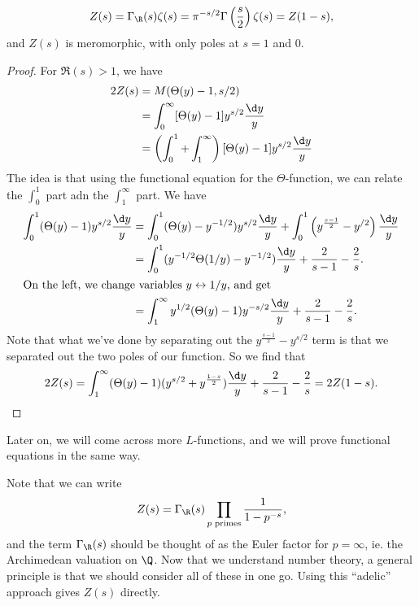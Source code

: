 \documentclass[a4paper]{article}
\begin{document}
\begin{thm}
  \[
    Z(s) = \Gamma_\R(s) \zeta(s) = \pi^{-s/2} \Gamma\left(\frac{s}{2}\right) \zeta(s) = Z(1 - s),
  \]
  and $Z(s)$ is meromorphic, with only poles at $s = 1$ and $0$.
\end{thm}

\begin{proof}
  For $\Re(s) > 1$, we have
  \begin{align*}
    2Z(s) &= M(\Theta(y) - 1, s/2) \\
    &= \int_0^\infty [\Theta(y) - 1] y^{s/2} \frac{\d y}{y}\\
    &= \left(\int_0^1 + \int_1^\infty\right)[\Theta(y) - 1] y^{s/2} \frac{\d y}{y}\\
  \end{align*}
  The idea is that using the functional equation for the $\Theta$-function, we can relate the $\int_0^1$ part adn the $\int_1^\infty$ part. We have
  \begin{align*}
    \int_0^1 (\Theta(y) - 1) y^{s/2} \frac{\d y}{y} &= \int_0^1 (\Theta(y) - y^{-1/2}) y^{s/2} \frac{\d y}{y} + \int_0^1 \left(y^{\frac{s - 1}{2}} - y^{/2}\right) \frac{\d y}{y}\\
    &= \int_0^1 (y^{-1/2} \Theta(1/y) - y^{-1/2}) \frac{\d y}{y} + \frac{2}{s - 1} - \frac{2}{s}.\\
    \intertext{On the left, we change variables $y \leftrightarrow 1/y$, and get}
    &= \int_1^\infty y^{1/2} (\Theta(y) - 1) y^{-s/2} \frac{\d y}{y} + \frac{2}{s - 1} - \frac{2}{s}.
  \end{align*}
  Note that what we've done by separating out the $y^{\frac{s - 1}{2}} - y^{s/2}$ term is that we separated out the two poles of our function. So we find that
  \[
    2Z(s) = \int_1^\infty (\Theta(y) - 1)(y^{s/2} + y^{\frac{1 - s}{2}}) \frac{\d y}{y} + \frac{2}{s - 1} - \frac{2}{s} = 2Z(1 - s).
  \]
\end{proof}
Later on, we will come across more $L$-functions, and we will prove functional equations in the same way.

Note that we can write
\[
  Z(s) = \Gamma_\R(s) \prod_{p\text{ primes}} \frac{1}{1 - p^{-s}},
\]
and the term $\Gamma_\R(s)$ should be thought of as the Euler factor for $p = \infty$, ie. the Archimedean valuation on $\Q$. Now that we understand number theory, a general principle is that we should consider all of these in one go. Using this ``adelic'' approach gives $Z(s)$ directly.
\end{document}
